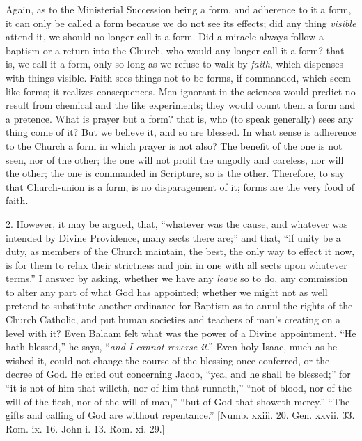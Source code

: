 Again, as to the Ministerial Succession being a form, and adherence
to it a form, it can only be called a form because we do not see its
effects; did any thing \emph{visible} attend it, we should no longer
call it a form. Did a miracle always follow a baptism or a return into
the Church, who would any longer call it a form? that is, we call it a
form, only so long as we refuse to walk by \emph{faith}, which
dispenses with things visible. Faith sees things not to be forms, if
commanded, which seem like forms; it realizes consequences. Men
ignorant in the sciences would predict no result from chemical and the
like experiments; they would count them a form and a pretence. What is
prayer but a form? that is, who (to speak generally) sees any thing
come of it? But we believe it, and so are blessed. In what sense is
adherence to the Church a form in which prayer is not also? The
benefit of the one is not seen, nor of the other; the one will not
profit the ungodly and careless, nor will the other; the one is
commanded in Scripture, so is the other. Therefore, to say that
Church-union is a form, is no disparagement of it; forms are the very
food of faith.

2. However, it may be argued, that, ``whatever was the cause,
and whatever was intended by Divine Providence, many sects there
are;'' and that, ``if unity be a duty, as members of the
Church maintain, the best, the only way to effect it now, is for them
to relax their strictness and join in one with all sects upon whatever
terms.'' I answer by asking, whether we have any \emph{leave} so
to do, any commission to alter any part of what God has appointed;
whether we might not as well pretend to substitute another ordinance
for Baptism as to annul the rights of the Church Catholic, and put
human societies and teachers of man's creating on a level with it?
Even Balaam felt what was the power of a Divine appointment. ``He
hath blessed,'' he says, ``\emph{and I cannot reverse it}.''
Even holy Isaac, much as he wished it, could not change the course of
the blessing once conferred, or the decree of God. He cried out
concerning Jacob, ``yea, and he shall be blessed;'' for
``it is not of him that willeth, nor of him that runneth,''
``not of blood, nor of the will of the flesh, nor of the will of
man,'' ``but of God that showeth mercy.'' ``The gifts
and calling of God are without repentance.'' [Numb. xxiii. 20.
Gen. xxvii. 33. Rom. ix. 16. John i. 13. Rom. xi. 29.]

